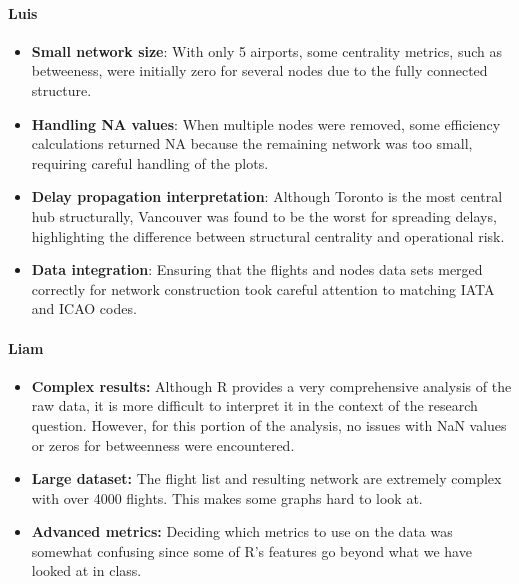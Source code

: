 \documentclass[11pt]{article}
\begin{document}
\paragraph*{Luis}
\begin{itemize}[leftmargin=*]
    \item \textbf{Small network size}: With only 5 airports, some centrality metrics, such as betweeness, were initially zero for several nodes due to the fully connected structure.
    \item \textbf{Handling NA values}: When multiple nodes were removed, some efficiency calculations returned NA because the remaining network was too small, requiring careful handling of the plots.
    \item \textbf{Delay propagation interpretation}: Although Toronto is the most central hub structurally, Vancouver was found to be the worst for spreading delays, highlighting the difference between structural centrality and operational risk.
    \item \textbf{Data integration}: Ensuring that the flights and nodes data sets merged correctly for network construction took careful attention to matching IATA and ICAO codes.
\end{itemize}

\paragraph*{Liam}
\begin{itemize}[leftmargin=*]
    \item \textbf{Complex results:} Although R provides a very comprehensive analysis of the raw data, it is more difficult to interpret it in the context of the research question. However, for this portion of the analysis, no issues with NaN values or zeros for betweenness were encountered.
    \item \textbf{Large dataset:} The flight list and resulting network are extremely complex with over 4000 flights. This makes some graphs hard to look at.
    \item \textbf{Advanced metrics:} Deciding which metrics to use on the data was somewhat confusing since some of R's features go beyond what we have looked at in class.
\end{itemize}
\end{document}

